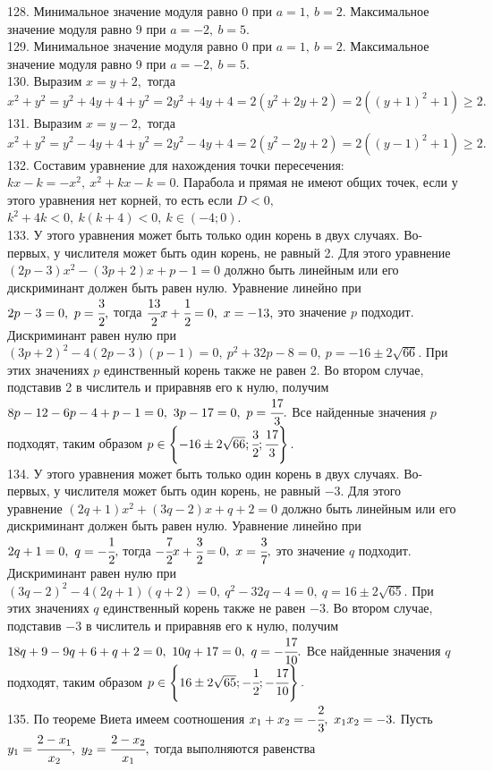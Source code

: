 \documentclass[12pt]{article}
\begin{document}
128. Минимальное значение модуля равно 0 при $a=1,\ b=2.$ Максимальное значение модуля равно 9 при $a=-2,\ b=5.$\\
129. Минимальное значение модуля равно 0 при $a=1,\ b=2.$ Максимальное значение модуля равно 9 при $a=-2,\ b=5.$\\
130. Выразим $x=y+2,$ тогда $x^2+y^2=y^2+4y+4+y^2=2y^2+4y+4=2(y^2+2y+2)=2((y+1)^2+1)\geqslant2.$\\
131. Выразим $x=y-2,$ тогда $x^2+y^2=y^2-4y+4+y^2=2y^2-4y+4=2(y^2-2y+2)=2((y-1)^2+1)\geqslant2.$\\
132. Составим уравнение для нахождения точки пересечения: $kx-k=-x^2,\ x^2+kx-k=0.$ Парабола и прямая не имеют общих точек, если у этого уравнения нет корней, то есть если $D<0,$\\ $k^2+4k<0,\ k(k+4)<0,\ k\in(-4;0).$\\
133. У этого уравнения может быть только один корень в двух случаях. Во-первых, у числителя может быть один корень, не равный 2. Для этого уравнение $(2p-3)x^2-(3p+2)x+p-1=0$ должно быть линейным или его дискриминант должен быть равен нулю. Уравнение линейно при $2p-3=0,\ p=\cfrac{3}{2},$ тогда $\cfrac{13}{2}x+\cfrac{1}{2}=0,\ x=-13,$ это значение $p$ подходит. Дискриминант равен нулю при $(3p+2)^2-4(2p-3)(p-1)=0,\ p^2+32p-8=0,\ p=-16\pm2\sqrt{66}.$ При этих значениях $p$ единственный корень также не равен 2. Во втором случае, подставив 2 в числитель и приравняв его к нулю, получим $8p-12-6p-4+p-1=0,\ 3p-17=0,\ p=\cfrac{17}{3}.$ Все найденные значения $p$ подходят, таким образом $p\in\left\{-16\pm2\sqrt{66};\cfrac{3}{2};\cfrac{17}{3}\right\}.$\\
134. У этого уравнения может быть только один корень в двух случаях. Во-первых, у числителя может быть один корень, не равный $-3.$ Для этого уравнение $(2q+1)x^2+(3q-2)x+q+2=0$ должно быть линейным или его дискриминант должен быть равен нулю. Уравнение линейно при $2q+1=0,\ q=-\cfrac{1}{2},$ тогда $-\cfrac{7}{2}x+\cfrac{3}{2}=0,\ x=\cfrac{3}{7},$ это значение $q$ подходит. Дискриминант равен нулю при $(3q-2)^2-4(2q+1)(q+2)=0,\ q^2-32q-4=0,\ q=16\pm2\sqrt{65}.$ При этих значениях $q$ единственный корень также не равен $-3.$ Во втором случае, подставив $-3$ в числитель и приравняв его к нулю, получим $18q+9-9q+6+q+2=0,\ 10q+17=0,\ q=-\cfrac{17}{10}.$ Все найденные значения $q$ подходят, таким образом $p\in\left\{16\pm2\sqrt{65};-\cfrac{1}{2};-\cfrac{17}{10}\right\}.$\\
135. По теореме Виета имеем соотношения $x_1+x_2=-\cfrac{2}{3},\ x_1x_2=-3.$ Пусть $y_1=\cfrac{2-x_1}{x_2},\ y_2=\cfrac{2-x_2}{x_1},$ тогда выполняются равенства
\end{document}
